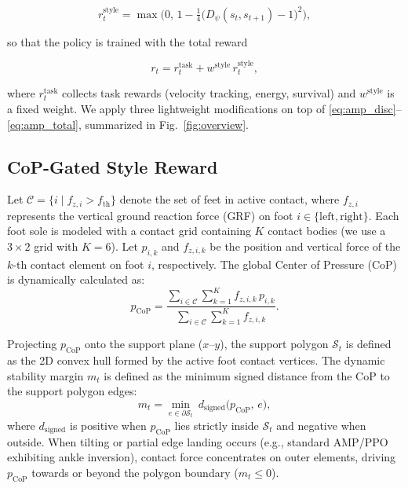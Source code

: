 \documentclass[conference]{IEEEtran}
\begin{document}
\begin{equation}
r^{\mathrm{style}}_t = \max\big(0,\,1-\tfrac{1}{4}\big(D_\psi(s_t,s_{t+1})-1\big)^2\big),
\label{eq:amp_style}
\end{equation}

so that the policy is trained with the total reward

\begin{equation}
r_t = r^{\mathrm{task}}_t + w^{\mathrm{style}}\,r^{\mathrm{style}}_t,
\label{eq:amp_total}
\end{equation}

where $r^{\mathrm{task}}_t$ collects task rewards (velocity tracking, energy, survival) and $w^{\mathrm{style}}$ is a fixed weight. We apply three lightweight modifications on top of \eqref{eq:amp_disc}--\eqref{eq:amp_total}, summarized in Fig.~\ref{fig:overview}.

\subsection{CoP-Gated Style Reward}
\label{subsec:method_cop}

Let $\mathcal{C}=\{i\mid f_{z,i}>f_{\mathrm{th}}\}$ denote the set of feet in active contact, where $f_{z,i}$ represents the vertical ground reaction force (GRF) on foot $i \in \{\text{left}, \text{right}\}$. Each foot sole is modeled with a contact grid containing $K$ contact bodies (we use a $3\times 2$ grid with $K=6$). Let $p_{i,k}$ and $f_{z,i,k}$ be the position and vertical force of the $k$-th contact element on foot $i$, respectively. The global Center of Pressure (CoP) is dynamically calculated as:
\begin{equation}
p_{\mathrm{CoP}} = \frac{\sum_{i\in\mathcal{C}} \sum_{k=1}^K f_{z,i,k}\, p_{i,k}}{\sum_{i\in\mathcal{C}} \sum_{k=1}^K f_{z,i,k}}.
\label{eq:cop}
\end{equation}

Projecting $p_{\mathrm{CoP}}$ onto the support plane ($x$--$y$), the support polygon $\mathcal{S}_t$ is defined as the 2D convex hull formed by the active foot contact vertices. The dynamic stability margin $m_t$ is defined as the minimum signed distance from the CoP to the support polygon edges:
\begin{equation}
m_t = \min_{e\in\partial\mathcal{S}_t}\ d_{\mathrm{signed}}\big(p_{\mathrm{CoP}},\,e\big),
\label{eq:margin}
\end{equation}
where $d_{\mathrm{signed}}$ is positive when $p_{\mathrm{CoP}}$ lies strictly inside $\mathcal{S}_t$ and negative when outside. When tilting or partial edge landing occurs (e.g., standard AMP/PPO exhibiting ankle inversion), contact force concentrates on outer elements, driving $p_{\mathrm{CoP}}$ towards or beyond the polygon boundary ($m_t \le 0$).
\end{document}
